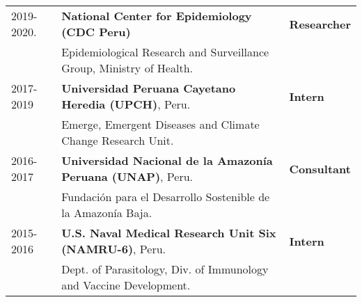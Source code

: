 \documentclass[margin,line]{res}
\newenvironment{list1}{
  \begin{list}{\ding{113}}{%
      \setlength{\itemsep}{0in}
      \setlength{\parsep}{0in} \setlength{\parskip}{0in}
      \setlength{\topsep}{0in} \setlength{\partopsep}{0in}
      \setlength{\leftmargin}{0.17in}}}{\end{list}}
\newenvironment{list2}{
  \begin{list}{$\bullet$}{%
      \setlength{\itemsep}{0in}
      \setlength{\parsep}{0in} \setlength{\parskip}{0in}
      \setlength{\topsep}{0in} \setlength{\partopsep}{0in}
      \setlength{\leftmargin}{0.2in}}}{\end{list}}
\begin{document}
\begin{resume}
\begin{tabular}{ l l l }
	2019-2020. & \textbf{National Center for Epidemiology (CDC Peru)}&{\bf Researcher}\\
	& Epidemiological Research and Surveillance Group, Ministry of Health.&\\
	2017-2019 & \textbf{Universidad Peruana Cayetano Heredia (UPCH)}, Peru.&{\bf Intern}\\
	& Emerge, Emergent Diseases and Climate Change Research Unit.&\\
	2016-2017 & \textbf{Universidad Nacional de la Amazon\'ia Peruana (UNAP)}, Peru.&{\bf Consultant}\\
	& Fundaci\'on para el Desarrollo Sostenible de la Amazon\'ia Baja.&\\
	2015-2016 & \textbf{U.S. Naval Medical Research Unit Six (NAMRU-6)}, Peru.&{\bf Intern}\\
	& Dept. of Parasitology, Div. of Immunology and Vaccine Development.&\\
\end{tabular}%




\end{resume}
\end{document}
